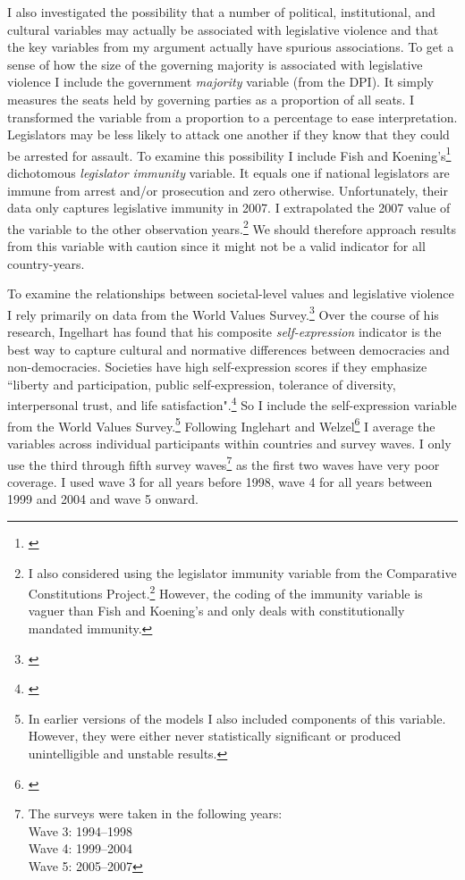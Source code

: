 \documentclass[a4paper]{article}\usepackage[]{graphicx}\usepackage[]{color}
\begin{document}
I also investigated the possibility that a number of political, institutional, and cultural variables may actually be associated with legislative violence and that the key variables from my argument actually have spurious associations. To get a sense of how the size of the governing majority is associated with legislative violence I include the government {\emph{majority}} variable (from the DPI). It simply measures the seats held by governing parties as a proportion of all seats. I transformed the variable from a proportion to a percentage to ease interpretation. Legislators may be less likely to attack one another if they know that they could be arrested for assault. To examine this possibility I include Fish and Koening's\footnote{\citealt{Fish2009}} dichotomous \emph{legislator immunity} variable. It equals one if national legislators are immune from arrest and/or prosecution and zero otherwise. Unfortunately, their data only captures legislative immunity in 2007. I extrapolated the 2007 value of the variable to the other observation years.\footnote{I also considered using the legislator immunity variable from the Comparative Constitutions Project.\footnote{\citealt{ElkinsCCP2010}} However, the coding of the immunity variable is vaguer than Fish and Koening's and only deals with constitutionally mandated immunity.} We should therefore approach results from this variable with caution since it might not be a valid indicator for all country-years.

To examine the relationships between societal-level values and legislative violence I rely primarily on data from the World Values Survey.\footnote{\citealt{WVS2009}} Over the course of his research, Ingelhart has found that his composite {\emph{self-expression}} indicator is the best way to capture cultural and normative differences between democracies and non-democracies. Societies have high self-expression scores if they emphasize ``liberty and participation, public self-expression, tolerance of diversity, interpersonal trust, and life satisfaction".\footnote{\citealt[64]{Inglehart2003}} So I include the self-expression variable from the World Values Survey.\footnote{In earlier versions of the models I also included components of this variable. However, they were either never statistically significant or produced unintelligible and unstable results.} Following Inglehart and Welzel\footnote{\citealt{Inglehart2003}} I average the variables across individual participants within countries and survey waves. I only use the third through fifth survey waves\footnote{The surveys were taken in the following years: \\ Wave 3: 1994--1998 \\ Wave 4: 1999--2004 \\ Wave 5: 2005--2007} as the first two waves have very poor coverage. I used wave 3 for all years before 1998, wave 4 for all years between 1999 and 2004 and wave 5 onward. 
\end{document}
